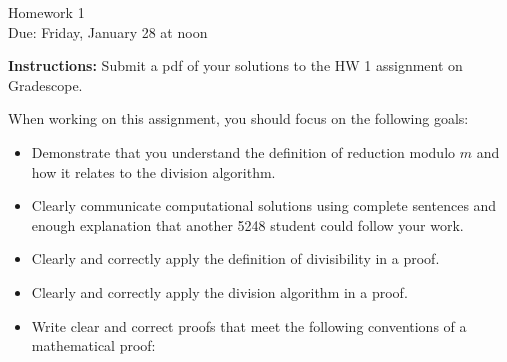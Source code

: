 \documentclass[12pt]{article}
\begin{document}
\begin{center}
{\Large Homework 1}\\
Due: Friday,  January 28 at noon\\


\end{center}
{\bf Instructions:} Submit a pdf of your solutions to the HW 1 assignment on Gradescope. 

When working on this assignment, you should focus on the following goals:
\begin{itemize}
\item Demonstrate that you understand the definition of reduction modulo $m$ and how it relates to the division algorithm. 
\item Clearly communicate computational solutions using complete sentences and enough explanation that another 5248 student could follow your work.
\item Clearly and correctly apply the definition of divisibility in a proof. 
\item Clearly and correctly apply the division algorithm in a proof.
\item Write clear and correct proofs that meet the following conventions of a mathematical proof:
\end{itemize}
\end{document}

